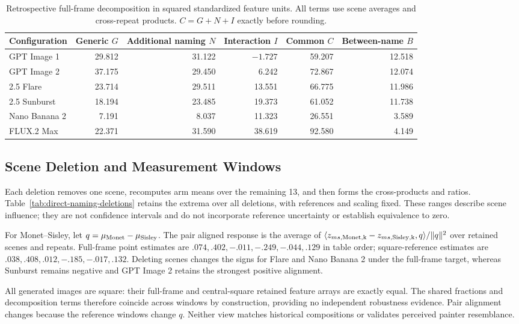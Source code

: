 \begin{table}[htbp]
\caption{Retrospective full-frame decomposition in squared standardized feature units.
All terms use scene averages and cross-repeat products. $C=G+N+I$ exactly before rounding.}
\label{tab:direct-naming-terms}
\centering\small
\begin{tabular}{@{}lrrrrr@{}}\toprule
Configuration & Generic $G$ & Additional naming $N$ & Interaction $I$ & Common $C$ & Between-name $B$\\\midrule
GPT Image 1 & 29.812 & 31.122 & $-1.727$ & 59.207 & 12.518\\
GPT Image 2 & 37.175 & 29.450 & 6.242 & 72.867 & 12.074\\
2.5 Flare & 23.714 & 29.511 & 13.551 & 66.775 & 11.986\\
2.5 Sunburst & 18.194 & 23.485 & 19.373 & 61.052 & 11.738\\
Nano Banana 2 & 7.191 & 8.037 & 11.323 & 26.551 & 3.589\\
FLUX.2 Max & 22.371 & 31.590 & 38.619 & 92.580 & 4.149\\
\bottomrule\end{tabular}
\end{table}

\subsection{Scene Deletion and Measurement Windows}
Each deletion removes one scene, recomputes arm means over the remaining 13,
and then forms the cross-products and ratios. Table~\ref{tab:direct-naming-deletions}
retains the extrema over all deletions, with references and scaling fixed.
These ranges describe scene influence; they are not confidence intervals and
do not incorporate reference uncertainty or establish equivalence to zero.

For Monet--Sisley, let $q=\mu_{\rm Monet}-\mu_{\rm Sisley}$. The pair aligned
response is the average of
$\langle z_{ms,\rm Monet,k}-z_{ms,\rm Sisley,k},q\rangle/\|q\|^2$ over retained
scenes and repeats. Full-frame point estimates are $.074,.402,-.011,-.249,-.044,.129$
in table order; square-reference estimates are $.038,.408,.012,-.185,-.017,.132$.
Deleting scenes changes the signs for Flare and Nano Banana 2 under the
full-frame target, whereas Sunburst remains negative and GPT Image 2 retains
the strongest positive alignment.

All generated images are square: their full-frame and central-square retained
feature arrays are exactly equal. The shared fractions and decomposition terms
therefore coincide across windows by construction, providing no independent
robustness evidence. Pair alignment changes because the reference windows
change $q$. Neither view matches historical compositions or validates perceived
painter resemblance.

